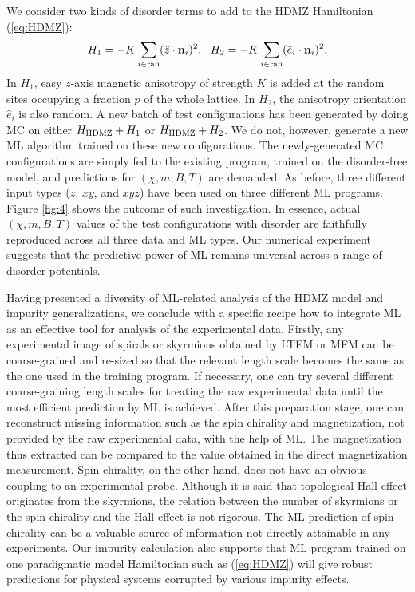 \documentclass[reprint,amsmath,amssymb,aps,showpacs,superscriptaddress,prl]{revtex4-1}
\newcommand{\ba}{\begin{eqnarray}}
\newcommand{\ea}{\end{eqnarray}}
\renewcommand{\v}[1]{{\bf #1}}
\begin{document}
We consider two kinds of disorder terms to add to the HDMZ Hamiltonian (\ref{eq:HDMZ}):
%
\ba H_{1} = -K \sum_{i \in {\rm ran}} (\hat{z} \cdot \v n_i )^2 , ~~ H_2 = - K \sum_{i \in {\rm ran}} (\hat{e}_i \cdot \v n_i )^2 .  \ea
%
In $H_1$, easy $z$-axis magnetic anisotropy of strength $K$ is added at the random sites occupying a fraction $p$ of the whole lattice. In $H_2$, the anisotropy orientation $\hat{e}_i$ is also random. A new batch of test configurations has been generated by doing MC on either  $H_{\rm HDMZ} + H_1$ or $H_{\rm HDMZ} + H_2$. We do not, however, generate a new ML algorithm trained on these new configurations. The newly-generated MC configurations are simply fed to the existing program, trained on the disorder-free model, and predictions for $(\chi, m, B, T)$ are demanded. As before, three different input types ($z$, $xy$, and $xyz$) have been used on three different ML programs. Figure \ref{fig:4} shows the outcome of such investigation. In essence, actual $(\chi, m, B, T)$ values of the test configurations with disorder are faithfully reproduced across all three data and ML types. Our numerical experiment suggests that the predictive power of ML remains universal across a range of disorder potentials.

Having presented a diversity of ML-related analysis of the HDMZ model and impurity generalizations, we conclude with a specific recipe how to integrate ML as an effective tool for analysis of the experimental data. Firstly, any experimental image of spirals or skyrmions obtained by LTEM or MFM can be coarse-grained and re-sized so that the relevant length scale becomes the same as the one used in the training program. If necessary, one can try several different coarse-graining length scales for treating the raw experimental data until the most efficient prediction by ML is achieved. After this preparation stage, one can reconstruct missing information such as the spin chirality and magnetization, not provided by the raw experimental data, with the help of ML. The magnetization thus extracted can be compared to the value obtained in the direct magnetization measurement. Spin chirality, on the other hand, does not have an obvious coupling to an experimental probe. Although it is said that topological Hall effect originates from the skyrmions, the relation between the number of skyrmions or the spin chirality and the Hall effect is not rigorous. The ML prediction of spin chirality can be a valuable source of information not directly attainable in any experiments. Our impurity calculation also supports that ML program trained on one paradigmatic model Hamiltonian such as (\ref{eq:HDMZ}) will give robust predictions for physical systems corrupted by various impurity effects. 
\end{document}
